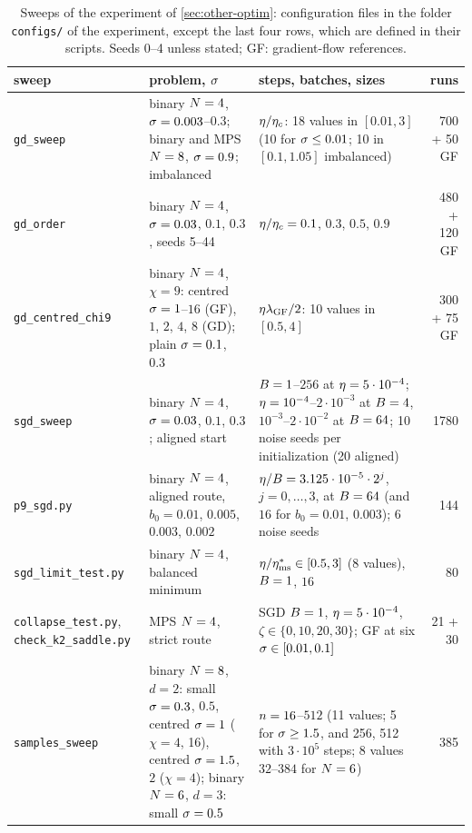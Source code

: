 \begin{table}[ht]
  \centering
  \caption{Sweeps of the experiment of \cref{sec:other-optim}: configuration files in the folder
    \texttt{configs/} of the experiment, except the last four rows, which are defined in their scripts.
    Seeds 0--4 unless stated; GF: gradient-flow references.}
  \label{tab:exp-optim}
  \footnotesize
  \begin{tabularx}{\textwidth}{@{}>{\raggedright\arraybackslash}p{3.0cm}
      >{\raggedright\arraybackslash}p{3.2cm}X r@{}}
    \toprule
    sweep & problem, $\sigma$ & steps, batches, sizes & runs \\
    \midrule
    \texttt{gd\_sweep} & binary $N=4$, $\sigma=0.003$--$0.3$; binary and MPS $N=8$, $\sigma=0.9$; imbalanced &
      $\eta/\eta_c$: 18 values in $[0.01,3]$ (10 for $\sigma\le0.01$; 10 in $[0.1,1.05]$ imbalanced) & 700 + 50 GF \\
    \texttt{gd\_order} & binary $N=4$, $\sigma=0.03$, $0.1$, $0.3$, seeds 5--44 & $\eta/\eta_c=0.1$, $0.3$, $0.5$,
      $0.9$ & 480 + 120 GF \\
    \texttt{gd\_centred\_chi9} & binary $N=4$, $\chi=9$: centred $\sigma=1$--$16$ (GF), $1$, $2$, $4$, $8$ (GD);
      plain $\sigma=0.1$, $0.3$ & $\eta\lambda_{\rm GF}/2$: 10 values in $[0.5,4]$ & 300 + 75 GF \\
    \texttt{sgd\_sweep} & binary $N=4$, $\sigma=0.03$, $0.1$, $0.3$; aligned start & $B=1$--$256$ at
      $\eta=5\cdot10^{-4}$; $\eta=10^{-4}$--$2\cdot10^{-3}$ at $B=4$, $10^{-3}$--$2\cdot10^{-2}$ at $B=64$; 10 noise
      seeds per initialization (20 aligned) & 1780 \\
    \texttt{p9\_sgd.py} & binary $N=4$, aligned route, $b_0=0.01$, $0.005$, $0.003$, $0.002$ &
      $\eta/B=3.125\cdot10^{-5}\cdot2^j$, $j=0,\dots,3$, at $B=64$ (and $16$ for $b_0=0.01$, $0.003$); 6
      noise seeds & 144 \\
    \texttt{sgd\_limit\_test.py} & binary $N=4$, balanced minimum & $\eta/\eta^*_{\rm ms}\in[0.5,3]$ (8 values),
      $B=1$, $16$ & 80 \\
    \texttt{collapse\_test.py}, \texttt{check\_k2\_saddle.py} & MPS $N=4$, strict route & SGD $B=1$,
      $\eta=5\cdot10^{-4}$, $\zeta\in\{0,10,20,30\}$; GF at six $\sigma\in[0.01,0.1]$ & 21 + 30 \\
    \texttt{samples\_sweep} & binary $N=8$, $d=2$: small $\sigma=0.3$, $0.5$, centred $\sigma=1$ ($\chi=4$, 16),
      centred $\sigma=1.5$, $2$ ($\chi=4$); binary $N=6$, $d=3$: small $\sigma=0.5$ & $n=16$--$512$ (11 values;
      5 for $\sigma\ge1.5$, and 256, 512 with $3\cdot10^5$ steps; 8 values $32$--$384$ for $N=6$) & 385 \\
    \bottomrule
  \end{tabularx}
\end{table}

